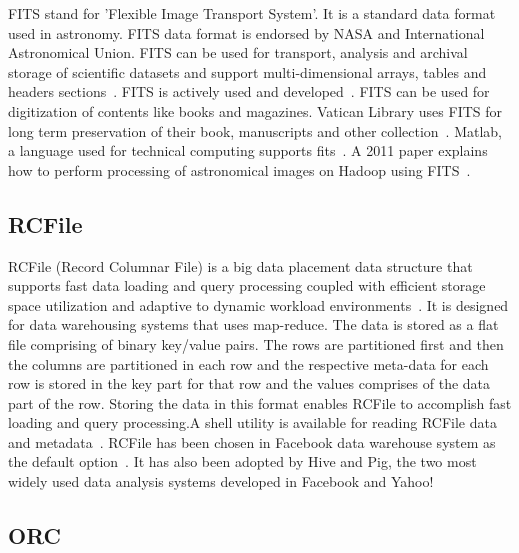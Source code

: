 FITS stand for 'Flexible Image Transport System'. It is a standard
data format used in astronomy. FITS data format is endorsed by NASA
and International Astronomical Union. FITS can be used for transport,
analysis and archival storage of scientific datasets and support
multi-dimensional arrays, tables and headers
sections~\cite{www-fits-nasa}.  FITS is actively used and
developed~\cite{www-news-fits-2016}.  FITS can be used for
digitization of contents like books and magazines. Vatican Library
uses FITS for long term preservation of their book, manuscripts and
other collection~\cite{www-fits-vatican-library}. Matlab, a language
used for technical computing supports fits~\cite{www-fits-matlab}. A
2011 paper explains how to perform processing of astronomical images
on Hadoop using FITS~\cite{paper-fits-2011}.

     \pv

\subsection{RCFile}

RCFile (Record Columnar File) is a big data placement data structure
that supports fast data loading and query processing coupled with
efficient storage space utilization and adaptive to dynamic workload
environments~\cite{www-rcfile-wiki}.  It is designed for data
warehousing systems that uses map-reduce. The data is stored as a flat
file comprising of binary key/value pairs. The rows are partitioned
first and then the columns are partitioned in each row and the
respective meta-data for each row is stored in the key part for that
row and the values comprises of the data part of the row. Storing the
data in this format enables RCFile to accomplish fast loading and
query processing.A shell utility is available for reading RCFile data
and metadata~\cite{www-rcfile-cat}. RCFile has been chosen in Facebook
data warehouse system as the default option~\cite{he2011rcfile}. It
has also been adopted by Hive and Pig, the two most widely used data
analysis systems developed in Facebook and Yahoo!

     \pv

\subsection{ORC}

